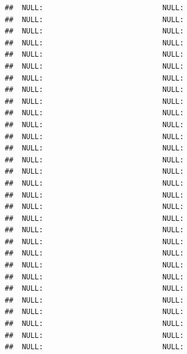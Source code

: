 \documentclass{article}\usepackage[]{graphicx}\usepackage[]{color}
\makeatletter
\newenvironment{kframe}{%
 \def\at@end@of@kframe{}%
 \ifinner\ifhmode%
  \def\at@end@of@kframe{\end{minipage}}%
  \begin{minipage}{\columnwidth}%
 \fi\fi%
 \def\FrameCommand##1{\hskip\@totalleftmargin \hskip-\fboxsep
 \colorbox{shadecolor}{##1}\hskip-\fboxsep
     \hskip-\linewidth \hskip-\@totalleftmargin \hskip\columnwidth}%
 \MakeFramed {\advance\hsize-\width
   \@totalleftmargin\z@ \linewidth\hsize
   \@setminipage}}%
 {\par\unskip\endMakeFramed%
 \at@end@of@kframe}
\newenvironment{knitrout}{}{} %
\makeatother
\begin{document}
\begin{knitrout}
\begin{kframe}
\begin{verbatim}
##  NULL:                            NULL:                                              
##  NULL:                            NULL:                                              
##  NULL:                            NULL:                                              
##  NULL:                            NULL:                                              
##  NULL:                            NULL:                                              
##  NULL:                            NULL:                                              
##  NULL:                            NULL:                                              
##  NULL:                            NULL:                                              
##  NULL:                            NULL:                                              
##  NULL:                            NULL:                                              
##  NULL:                            NULL:                                              
##  NULL:                            NULL:                                              
##  NULL:                            NULL:                                              
##  NULL:                            NULL:                                              
##  NULL:                            NULL:                                              
##  NULL:                            NULL:                                              
##  NULL:                            NULL:                                              
##  NULL:                            NULL:                                              
##  NULL:                            NULL:                                              
##  NULL:                            NULL:                                              
##  NULL:                            NULL:                                              
##  NULL:                            NULL:                                              
##  NULL:                            NULL:                                              
##  NULL:                            NULL:                                              
##  NULL:                            NULL:                                              
##  NULL:                            NULL:                                              
##  NULL:                            NULL:                                              
##  NULL:                            NULL:                                              
##  NULL:                            NULL:                                              
##  NULL:                            NULL:                                              

\end{verbatim}
\end{kframe}
\end{knitrout}
\end{document}
